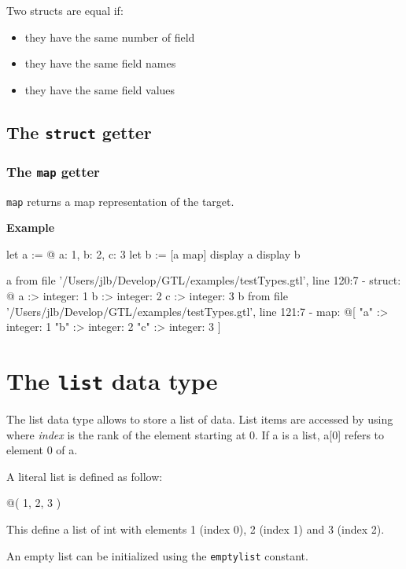 \documentclass[10pt,openright,twosides]{report}
\newcommand{\var}[1]{{\small\ttfamily #1}}
\newcommand{\gtlinline}[1]{\colorbox{light-blue}{\lstinline[language=gtl]{#1}}}
\newcommand{\example}{\vspace{.75em}\noindent\textbf{Example}\vspace{0em}}
\begin{document}
Two structs are equal if:
\begin{itemize}
\item they have the same number of field
\item they have the same field names
\item they have the same field values
\end{itemize}

\subsection{The \texttt{struct} getter}

\subsubsection{The \texttt{map} getter}
\label{sec:mapGetterOnStruct}

\gtlinline{map} returns a map representation of the target.

\example
\begin{gtl}
let a := @{ a: 1, b: 2, c: 3 }
let b := [a map]
display a
display b
\end{gtl}
\begin{console}
a from file '/Users/jlb/Develop/GTL/examples/testTypes.gtl', line 120:7
  - struct: @{
    a :>
        integer: 1
    b :>
        integer: 2
    c :>
        integer: 3
}
b from file '/Users/jlb/Develop/GTL/examples/testTypes.gtl', line 121:7
  - map: @[
    "a" :>
        integer: 1
    "b" :>
        integer: 2
    "c" :>
        integer: 3
]
\end{console}

\section{The \texttt{list} data type}

The list data type allows to store a list of data. List items are accessed by using \var{[{\em index}]} where \var{\em index} is the rank of the element starting at 0. If \var{a} is a list, \var{a[0]} refers to element 0 of \var{a}.

A literal list is defined as follow:

\begin{gtl}
@( 1, 2, 3 )
\end{gtl}

This define a list of int with elements 1 (index 0), 2 (index 1) and 3 (index 2).

An empty list can be initialized using the \gtlinline{emptylist} constant.
\end{document}
